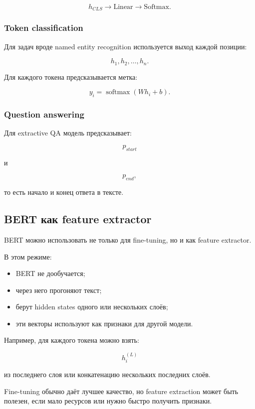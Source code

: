 \documentclass[a4paper,12pt]{article}
\begin{document}
\[
h_{CLS}
\rightarrow
\text{Linear}
\rightarrow
\text{Softmax}.
\]

\subsubsection{Token classification}

Для задач вроде named entity recognition используется выход каждой позиции:

\[
h_1, h_2, \dots, h_n.
\]

Для каждого токена предсказывается метка:

\[
y_i = \operatorname{softmax}(Wh_i+b).
\]

\subsubsection{Question answering}

Для extractive QA модель предсказывает:

\[
p_{start}
\]

и

\[
p_{end},
\]

то есть начало и конец ответа в тексте.

\subsection{BERT как feature extractor}

BERT можно использовать не только для fine-tuning, но и как feature extractor.

В этом режиме:

\begin{itemize}
    \item BERT не дообучается;
    \item через него прогоняют текст;
    \item берут hidden states одного или нескольких слоёв;
    \item эти векторы используют как признаки для другой модели.
\end{itemize}

Например, для каждого токена можно взять:

\[
h_i^{(L)}
\]

из последнего слоя или конкатенацию нескольких последних слоёв.

Fine-tuning обычно даёт лучшее качество, но feature extraction может быть полезен, если мало ресурсов или нужно быстро получить признаки.
\end{document}

